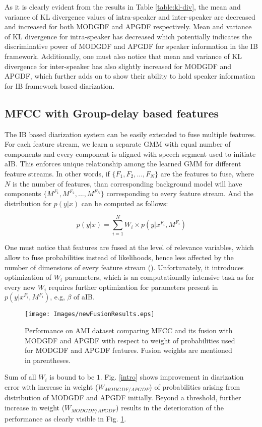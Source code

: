 \documentclass[conference]{IEEEtran}
\begin{document}
As it is clearly evident from the results in Table \ref{table:kl-div}, the mean and variance of KL divergence values of intra-speaker and inter-speaker are decreased and increased for both MODGDF and APGDF respectively. Mean and variance of KL divergence for intra-speaker has decreased which potentially indicates the discriminative power of MODGDF and APGDF for speaker information in the IB framework. Additionally, one must also notice that mean and variance of KL divergence for inter-speaker has also slightly increased for MODGDF and APGDF, which further adds on to show their ability to hold speaker information for IB framework based diarization.  

\subsection{MFCC with Group-delay based features}
\label{feature_fusion}
The IB based diarization system can be easily extended to fuse multiple features. For each feature stream, we learn a separate GMM with equal number of components and every component is aligned with speech segment used to initiate aIB. This enforces unique relationship among the learned GMM for different feature streams. In other words, if $\lbrace F_1,F_2,...,F_N \rbrace$ are the features to fuse, where $N$ is the number of features, than corresponding background model will have components $\lbrace M^{F_{1}},M^{F_{2}},...,M^{F_{N}}\rbrace$ corresponding to every feature stream. And the distribution for $p(y|x)$ can be computed as follows:       

\begin{equation}
p(y|x) = \sum _{i=1}^{N} W_i \times p(y|x^{F_{i}},M^{F_{i}})
\label{eq:feat_combs}
\end{equation}

One must notice that features are fused at the level of relevance variables, which allow to fuse probabilities instead of likelihoods, hence less affected by the number of dimensions of every feature stream (\cite{aIB}). Unfortunately, it introduces optimization of $W_i$ parameters, which is an computationally intensive task as for every new $W_i$ requires further optimization for parameters present in $p(y|x^{F_{i}},M^{F_{i}})$, e.g, $\beta$ of aIB.

\begin{figure}[h]
\centering
\texttt{[image: Images/newFusionResults.eps]}
\caption{Performance on AMI dataset comparing MFCC and its fusion with MODGDF and APGDF with respect to weight of probabilities used for MODGDF and APGDF features. Fusion weights are mentioned in parentheses.}
\label{fig:fusionResults}
\end{figure}
Sum of all $W_i$ is bound to be $1$. Fig. \ref{intro} shows improvement in diarization error with increase in weight ($W_{MODGDF/APGDF}$) of probabilities arising from distribution of MODGDF and APGDF initially. Beyond a threshold, further increase in weight ($W_{MODGDF/APGDF}$) results in the deterioration of the performance as clearly visible in Fig. \ref{fig:fusionResults}.   
\end{document}
